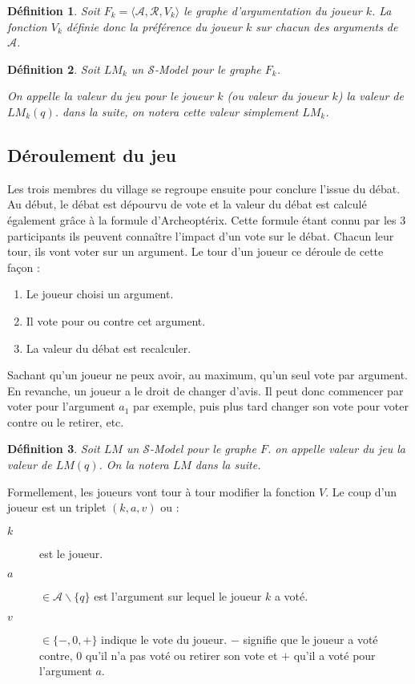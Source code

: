 \documentclass[11pt]{article}
\theoremstyle{defi}
\newtheorem{definition}{Définition}[section]
\theoremstyle{not}
\theoremstyle{prob}
\begin{document}
      \begin{definition}
        Soit $F_k = \langle \mathcal{A}, \mathcal{R}, V_k \rangle$ le graphe d'argumentation du joueur $k$.
        La fonction $V_k$ définie donc la préférence du joueur $k$ sur chacun des arguments de $\mathcal{A}$.
      \end{definition}
      \begin{definition}
        Soit $LM_k$ un $\mathcal{S}$-Model pour le graphe $F_k$.

        On appelle la valeur du jeu pour le joueur $k$ (ou valeur du joueur $k$) la valeur de $LM_k(q)$. dans la suite, on notera cette valeur simplement $LM_k$.
      \end{definition}

    \subsection{Déroulement du jeu}
      Les trois membres du village se regroupe ensuite pour conclure l'issue du débat.
      Au début, le débat est dépourvu de vote et la valeur du débat est calculé également grâce à la formule d'Archeoptérix.
      Cette formule étant connu par les 3 participants ils peuvent connaître l'impact d'un vote sur le débat.
      Chacun leur tour, ils vont voter sur un argument. Le tour d'un joueur ce déroule de cette façon :
      \begin{enumerate}
        \item Le joueur choisi un argument.
        \item Il vote pour ou contre cet argument.
        \item La valeur du débat est recalculer.
      \end{enumerate}


      Sachant qu'un joueur ne peux avoir, au maximum, qu'un seul vote par argument.
      En revanche, un joueur a le droit de changer d'avis.
      Il peut donc commencer par voter pour l'argument $a_1$ par exemple, puis plus tard changer son vote pour voter contre ou le retirer, etc.

      \begin{definition}
        Soit $LM$ un $\mathcal{S}$-Model pour le graphe $F$.
        on appelle valeur du jeu la valeur de $LM(q)$. On la notera $LM$ dans la suite.
      \end{definition}

      Formellement, les joueurs vont tour à tour modifier la fonction $V$.
      Le coup d'un joueur est un triplet $(k, a, v)$ ou :
      \begin{description}
        \item[$k$] est le joueur.
        \item[$a$] $\in \mathcal{A}\backslash \{q\}$ est l'argument sur lequel le joueur $k$ a voté.
        \item[$v$] $\in \{-, 0, +\}$ indique le vote du joueur. $-$ signifie que le joueur a voté contre, $0$ qu'il n'a pas voté ou retirer son vote et $+$ qu'il a voté pour l'argument $a$.
      \end{description}
\end{document}
